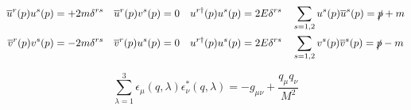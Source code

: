 \begin{gather*}
        \overline{u}^r(p)u^s(p) = +2m\delta^{rs}
        \quad
        \overline{u}^r(p)v^s(p) = 0
        \quad
        u^{r\dagger}(p)u^s(p) = 2E\delta^{rs}
        \quad
        \sum_{s=1,2}u^s(p)\overline{u}^s(p) = \slashed{p} + m
        \\
        \overline{v}^r(p)v^s(p) = -2m\delta^{rs}
        \quad
        \overline{v}^r(p)u^s(p) = 0
        \quad
        u^{r\dagger}(p)u^s(p) = 2E\delta^{rs}
        \quad
        \sum_{s=1,2}v^s(p)\overline{v}^s(p) = \slashed{p} - m
\end{gather*}

\begin{equation*}
        \sum_{\lambda=1}^{3} \epsilon_\mu(q,\lambda)\epsilon^*_\nu(q,\lambda)
        = -g_{\mu\nu} + \frac{q_\mu q_\nu}{M^2}
\end{equation*}
